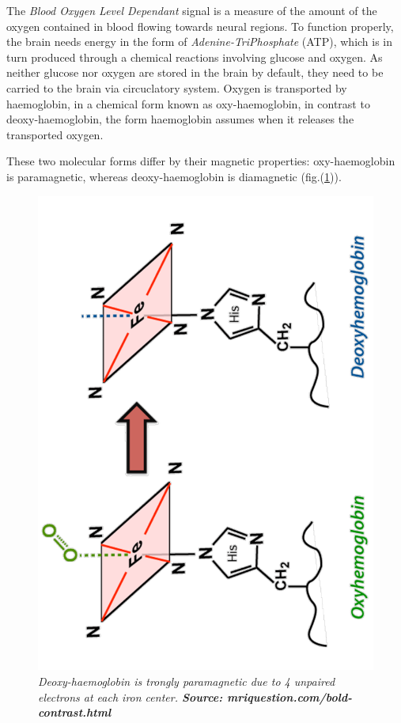 \documentclass[12pt,openright,twoside,a4paper]{book}
\begin{document}
The \textit{Blood Oxygen Level Dependant} signal  is a measure of the amount of the oxygen contained in blood flowing towards neural regions.
To function properly, the brain needs energy in the form of \textit{Adenine-TriPhosphate} (ATP), which is in turn produced through a chemical reactions involving glucose and oxygen.
As neither glucose nor oxygen are stored in the brain by default, they need to be carried to the brain via circuclatory system. 
Oxygen is transported by haemoglobin, in a chemical form  known as oxy-haemoglobin, in contrast to deoxy-haemoglobin, the form haemoglobin assumes when it releases the transported oxygen.

These two molecular forms differ by their magnetic properties: oxy-haemoglobin is paramagnetic, whereas deoxy-haemoglobin is diamagnetic (fig.(\ref{haemo})).

\begin{figure}[!h]
\centering
\includegraphics[scale=0.3, angle=270]{haemo}
\caption{\textit{ Deoxy-haemoglobin is trongly paramagnetic due to 4 unpaired electrons at each iron center. \textbf{Source: mriquestion.com/bold-contrast.html}}}
\label{haemo}
\end{figure}
\end{document}
